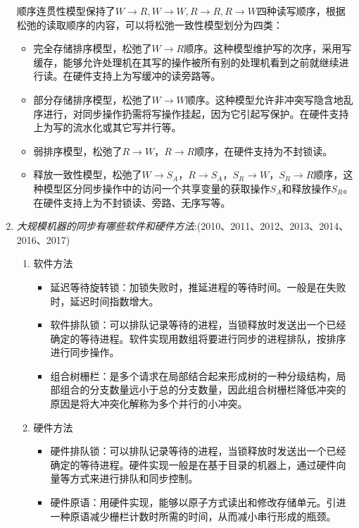 \documentclass[a4paper]{ctexbook}
\begin{document}
\begin{enumerate}
  顺序连贯性模型保持了$W\rightarrow R,W\rightarrow W,R\rightarrow R,R\rightarrow W$四种读写顺序，根据松弛的读取顺序的内容，可以将松弛一致性模型划分为四类：
  \begin{itemize}
    \item 完全存储排序模型，松弛了$W\rightarrow R$顺序。这种模型维护写的次序，采用写缓存，能够允许处理机在其写的操作被所有别的处理机看到之前就继续进行读。在硬件支持上为写缓冲的读旁路等。
    \item 部分存储排序模型，松弛了$W\rightarrow W$顺序。这种模型允许非冲突写隐含地乱序进行，对同步操作扔需将写操作挂起，因为它引起写保护。在硬件支持上为写的流水化或其它写并行等。
    \item 弱排序模型，松弛了$R\rightarrow W$，$R\rightarrow R$顺序，在硬件支持为不封锁读。
    \item 释放一致性模型，松弛了$W\rightarrow S_A$，$R\rightarrow S_A$，$S_R\rightarrow W$，$S_R\rightarrow R$顺序，这种模型区分同步操作中的访问一个共享变量的获取操作$S_A$和释放操作$S_R$。在硬件支持上为不封锁读、旁路、无序写等。
  \end{itemize}
  
  \item \emph{大规模机器的同步有哪些软件和硬件方法}:(2010、2011、2012、2013、2014、2016、2017)
  \begin{enumerate}
    \item 软件方法
    \begin{itemize}
      \item 延迟等待旋转锁：加锁失败时，推延进程的等待时间。一般是在失败时，延迟时间指数增大。
      \item 软件排队锁：可以排队记录等待的进程，当锁释放时发送出一个已经确定的等待进程。软件实现用数组将要进行同步的进程排队，按排序进行同步操作。
      \item 组合树栅栏：是多个请求在局部结合起来形成树的一种分级结构，局部组合的分支数量远小于总的分支数量，因此组合树栅栏降低冲突的原因是将大冲突化解称为多个并行的小冲突。
    \end{itemize}
    \item 硬件方法
    \begin{itemize}
      \item 硬件排队锁：可以排队记录等待的进程，当锁释放时发送出一个已经确定的等待进程。硬件实现一般是在基于目录的机器上，通过硬件向量等方式来进行排队和同步控制。
      \item 硬件原语：用硬件实现，能够以原子方式读出和修改存储单元。引进一种原语减少栅栏计数时所需的时间，从而减小串行形成的瓶颈。
    \end{itemize}
  \end{enumerate}
  

\end{enumerate}
\end{document}
